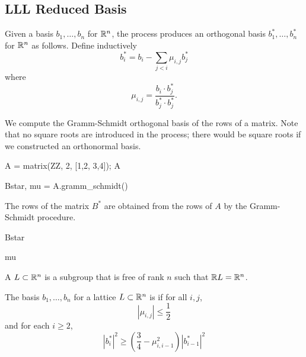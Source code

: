 \subsection{LLL Reduced Basis}
Given a basis $b_1,\ldots, b_n$ for $\mathbb{R}^n$, the  process produces an orthogonal basis
$b_1^*,\ldots, b_n^*$ for $\mathbb{R}^n$ as follows.  Define inductively
$$
	b_i^* = b_i - \sum_{j < i} \mu_{i,j} b_j^*
$$
where
$$
	\mu_{i,j} = \frac{b_i \cdot b_j^*}{b_j^* \cdot b_j^*}.
$$

\begin{example}
We compute the Gramm-Schmidt orthogonal basis of the rows
of a matrix.  Note that no square roots are introduced
in the process; there would be square roots if we
constructed an orthonormal basis.
\begin{sagecode}
\begin{sagecell}
A = matrix(ZZ, 2, [1,2, 3,4]); A
\end{sagecell}
\begin{sageout}
[1 2]
[3 4]
\end{sageout}
\begin{sagecell}
Bstar, mu = A.gramm_schmidt()
\end{sagecell}
\end{sagecode}

\noindent{}The rows of the matrix $B^*$ are obtained
from the rows of $A$ by the Gramm-Schmidt procedure.
\begin{sagecode}
\begin{sagecell}
Bstar
\end{sagecell}
\begin{sageout}
[   1    2]
[ 4/5 -2/5]
\end{sageout}
\begin{sagecell}
mu
\end{sagecell}
\begin{sageout}
[   0    0]
[11/5    0]
\end{sageout}
\end{sagecode}
\end{example}

A  $L\subset \mathbb{R}^n$ is a subgroup that
is free of rank $n$ such that $\mathbb{R} L = \mathbb{R}^n$.

\begin{definition}
The basis $b_1,\ldots, b_n$ for a lattice $L\subset \mathbb{R}^n$
is  if for all $i,j$,
$$
	 |\mu_{i,j}| \leq \frac{1}{2}
$$
and for each $i\geq 2$,
$$
	|b_i^*|^2 \geq \left( \frac{3}{4} - \mu_{i,i-1}^2\right) | b_{i-1}^*|^2
$$

\end{definition}

